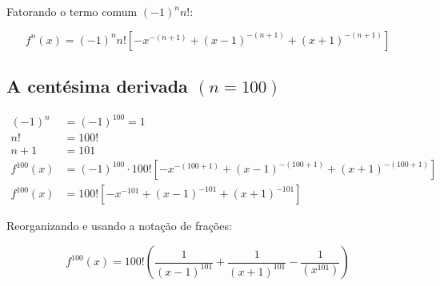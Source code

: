 \documentclass[../resumo.tex]{subfiles}
\begin{document}
	Fatorando o termo comum $(-1)^nn!$:

	\[ f^n(x) = (-1)^n n! [-x^{-(n+1)} + (x-1)^{-(n+1)} + (x+1)^{-(n+1)}] \]

	\subsection{A centésima derivada $(n=100)$}

	\begin{align*}
		(-1)^n &= (-1)^{100} = 1 \\
		n! &= 100! \\
		n + 1 &= 101 \\
		f^{100}(x) &= (-1)^{100} \cdot 100! [-x^{-(100+1)} + (x-1)^{-(100+1)} + (x+1)^{-(100+1)}] \\
		f^{100}(x) &= 100! [-x^{-101} + (x-1)^{-101} + (x+1)^{-101}]
	\end{align*}

	Reorganizando e usando a notação de frações:

	\[ f^{100}(x) = 100! \left( \frac{1}{(x-1)^{101}} + \frac{1}{(x+1)^{101}} - \frac{1}{(x^{101})} \right) \]
\end{document}
